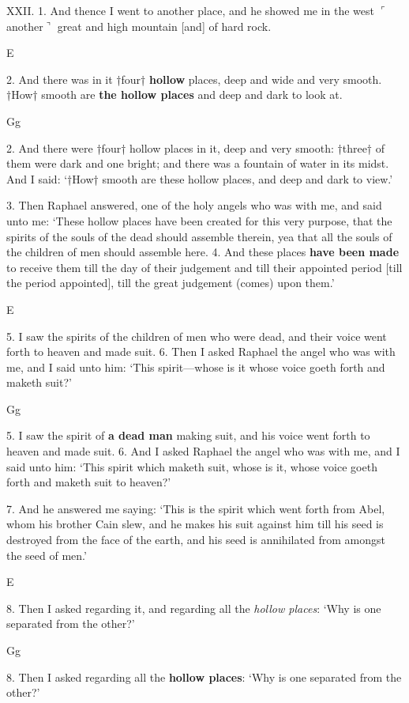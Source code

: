 XXII. 1. And thence I went to another place, and
he showed me in the west $\ulcorner$another$\urcorner$ great and high
mountain [and] of hard rock.

E

2. And there was in it
†four† \textbf{hollow} places,
deep and wide and very
smooth. †How† smooth
are \textbf{the hollow places}
and deep and dark to
look at.

Gg

2. And there were
†four† hollow places in it,
deep and very smooth:
†three† of them were dark
and one bright; and there
was a fountain of water in
its midst. And I said:
‘†How† smooth are these
hollow places, and deep
and dark to view.’

3. Then Raphael answered, one of the holy angels
who was with me, and said unto me: ‘These hollow
places have been created for this very purpose, that
the spirits of the souls of the dead should assemble
therein, yea that all the souls of the children of men
should assemble here. 4. And these places \textbf{have
been made} to receive them till the day of their judgement
and till their appointed period [till the period
appointed], till the great judgement (comes) upon
them.’

E

5. I saw the spirits of
the children of men who
were dead, and their voice
went forth to heaven and
made suit. 6. Then I
asked Raphael the angel
who was with me, and
I said unto him: ‘This
spirit—whose is it whose
voice goeth forth and
maketh suit?’

Gg

5. I saw the spirit of
\textbf{a dead man} making suit,
and his voice went forth
to heaven and made suit.
6. And I asked Raphael
the angel who was with
me, and I said unto him:
‘This spirit which maketh
suit, whose is it, whose
voice goeth forth and
maketh suit to heaven?’

7. And he answered me saying: ‘This is the spirit
which went forth from Abel, whom his brother Cain
slew, and he makes his suit against him till his seed
is destroyed from the face of the earth, and his seed
is annihilated from amongst the seed of men.’

E

8. Then I asked regarding
it, and regarding all
the \emph{hollow places}: ‘Why
is one separated from the
other?’

Gg

8. Then I asked regarding
all the \textbf{hollow
places}: ‘Why is one
separated from the
other?’


